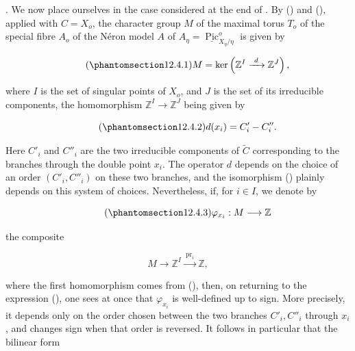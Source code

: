 \medskip
\noindent
{}. We now place ourselves in the case considered at the end of .
By () and (), applied with $C=X_o$, the character group
$M$ of the maximal torus $T_o$ of the special fibre $A_o$ of the
N\'eron model $A$ of
$A_\eta=\underline{\operatorname{Pic}}^o_{X_\eta/\eta}$ is given by

\begin{equation}\tag{\SGARefTarget{sga7.sga7i.eix.n12-4-1}{12.4.1}}
 M=\ker\left(\mathbb Z^I\xrightarrow{\ d\ }\mathbb Z^J\right),
\end{equation}

\noindent
where $I$ is the set of singular points of $X_o$, and $J$ is the set of
its irreducible components, the homomorphism
$\mathbb Z^I\to\mathbb Z^J$ being given by

\begin{equation}\tag{\SGARefTarget{sga7.sga7i.eix.n12-4-2}{12.4.2}}
 d(x_i)=C'_i-C''_i.
\end{equation}

Here $C'_i$ and $C''_i$ are the two irreducible components of
$\widetilde C$ corresponding to the branches through the double point
$x_i$. The operator $d$ depends on the choice of an order
$(C'_i,C''_i)$ on these two branches, and the isomorphism ()
plainly depends on this system of choices. Nevertheless, if, for
$i\in I$, we denote by

\begin{equation}\tag{\SGARefTarget{sga7.sga7i.eix.n12-4-3}{12.4.3}}
 \varphi_{x_i}:M\longrightarrow\mathbb Z
\end{equation}

\noindent
the composite

\begin{equation*}
 M\longrightarrow\mathbb Z^I
   \xrightarrow{\ \operatorname{pr}_i\ }\mathbb Z,
\end{equation*}

\noindent
where the first homomorphism comes from (), then, on returning to
the expression (), one sees at once that $\varphi_{x_i}$ is
well-defined up to sign. More precisely, it depends only on the order
chosen between the two branches $C'_i,C''_i$ through $x_i$, and changes
sign when that order is reversed. It follows in particular that the
bilinear form

